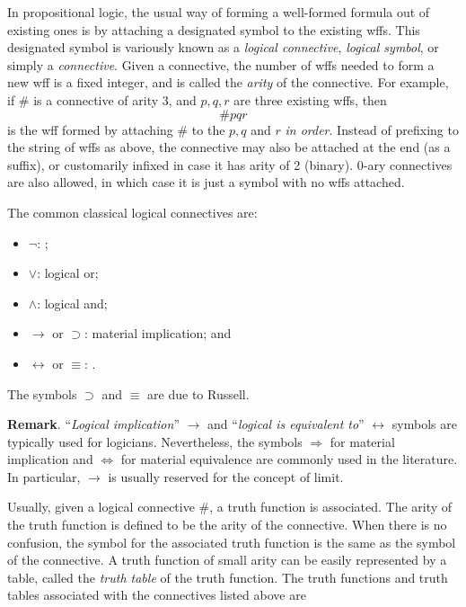 \documentclass[12pt]{article}
\begin{document}

In propositional logic, the usual way of forming a well-formed formula out of existing ones is by attaching a designated symbol to the existing wffs.  This designated symbol is variously known as a \emph{logical connective}, \emph{logical symbol}, or simply a \emph{connective}.  Given a connective, the number of wffs needed to form a new wff is a fixed integer, and is called the \emph{arity} of the connective.  For example, if $\#$ is a connective of arity 3, and $p,q,r$ are three existing wffs, then $$\#pqr$$ is the wff formed by attaching $\#$ to the $p,q$ and $r$ \emph{in order}.  Instead of prefixing to the string of wffs as above, the connective may also be attached at the end (as a suffix), or customarily infixed in case it has arity of 2 (binary).  $0$-ary connectives are also allowed, in which case it is just a symbol with no wffs attached.

The common classical logical connectives are:
\begin{itemize}
\item
$\lnot$: ;

\item
$\lor$: logical or;

\item
$\land$: logical and;

\item
$\rightarrow$ or $\supset$: material implication; and 

\item
$\leftrightarrow$ or $\equiv$: .
\end{itemize}
The symbols $\supset$ and $\equiv$ are due to Russell.

\textbf{Remark}.  ``\emph{Logical implication}'' $\to$ and ``\emph{logical is equivalent to}'' $\leftrightarrow$ symbols are typically used for logicians. Nevertheless, the symbols $\Rightarrow$ for material implication and $\Leftrightarrow$ for material equivalence are commonly used in the literature. In particular, $\to$ is usually reserved for the concept of limit.

Usually, given a logical connective $\#$, a truth function is associated.  The arity of the truth function is defined to be the arity of the connective.  When there is no confusion, the symbol for the associated truth function is the same as the symbol of the connective.  A truth function of small arity can be easily represented by a table, called the \emph{truth table} of the truth function.  The truth functions and truth tables associated with the connectives listed above are 
\end{document}
